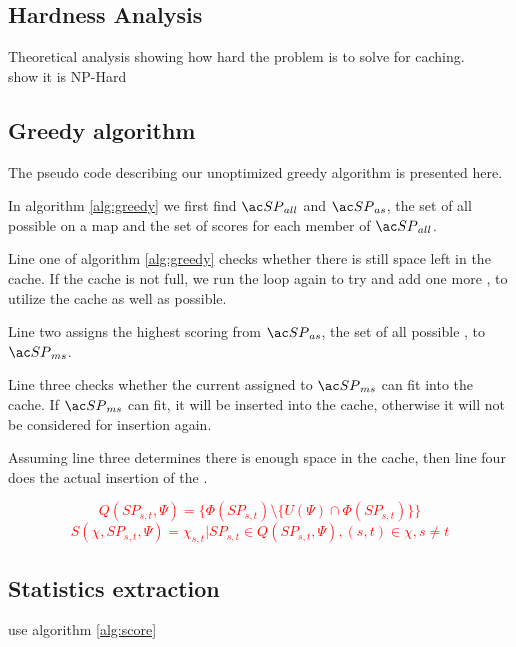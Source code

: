\subsection{Hardness Analysis}
Theoretical analysis showing how hard the problem is to solve for \spath caching.\\
show it is NP-Hard
 

\subsection{Greedy algorithm}
The pseudo code describing our unoptimized greedy algorithm is presented here.

In algorithm \ref{alg:greedy} we first find $\spath_{all}$ and $\spath_{as}$, the set of all possible \spaths on a map and the set of scores for each member of $\spath_{all}$.

Line one of algorithm \ref{alg:greedy} checks whether there is still space left in the cache. If the cache is not full, we run the loop again to try and add one more \spathns, to utilize the cache as well as possible.

Line two assigns the highest scoring \spath from $\spath_{as}$, the set of all possible \spathsns, to $\spath_{ms}$.

Line three checks whether the current \spath assigned to $\spath_{ms}$ can fit into the cache. If $\spath_{ms}$ can fit, it will be inserted into the cache, otherwise it will not be considered for insertion again.

Assuming line three determines there is enough space in the cache, then line four does the actual insertion of the \spathns.

\textcolor{red}{
\begin{equation} \label{eq:usp}
Q(SP_{s,t}, \Psi) = \{ \Phi(SP_{s,t}) \setminus \{ U(\Psi) \cap \Phi(SP_{s,t}) \} \}
\end{equation}
}
\textcolor{red}{
\begin{equation} \label{eq:score}
S(\chi, SP_{s,t}, \Psi) =  \chi_{s,t} | SP_{s,t} \in Q(SP_{s,t}, \Psi), (s,t) \in \chi, s \neq t
\end{equation}
}




\subsection{Statistics extraction}


use algorithm \ref{alg:score}


